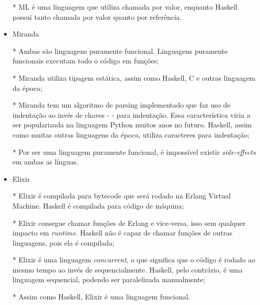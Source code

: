 \begin{itemize}
      * ML é uma linguagem que utiliza chamada por valor, enquanto Haskell possui tanto chamada por valor quanto por referência.

      \item Miranda 
      
      * Ambas são linguagens puramente funcional. Linguagens puramente funcionais executam todo o código em funções;

      * Miranda utiliza tipagem estática, assim como Haskell, C e outras linguagem da época;

      * Miranda tem um algoritmo de parsing implementado que faz uso de indentação ao invés de chaves - { } - para indentação. 
      Essa característica viria a ser popularizada na linguagem Python muitos anos no futuro. Haskell, assim como muitas outras linguagens da época, 
      utiliza caracteres para indentação;

      * Por ser uma linguagem puramente funcional, é impossível existir \emph{side-effects} em ambas as línguas.
      
      \item Elixir 
    
    * Elixir é compilada para bytecode que será rodado na Erlang Virtual Machine. Haskell é compilada para código de máquina;

    * Elixir consegue chamar funções de Erlang e vice-versa, isso sem qualquer impacto em \emph{runtime}. Haskell não é capaz de chamar funções de outras linguagens, pois ela é compilada;

    * Elixir é uma linguagem \emph{concurrent}, o que significa que o código é rodado ao mesmo tempo ao invés de sequencialmente. Haskell, pelo contrário, é uma linguagem sequencial, podendo ser paralelizada manualmente;

    * Assim como Haskell, Elixir é uma linguagem funcional.

    
    \end{itemize}
